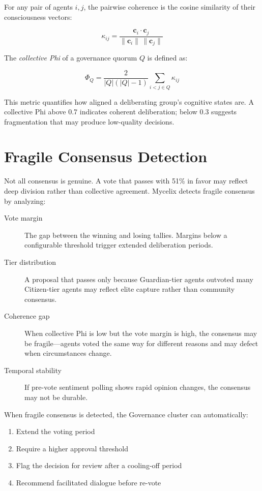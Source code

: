 \documentclass[12pt]{book}
\begin{document}
For any pair of agents $i, j$, the pairwise coherence is the cosine similarity
of their consciousness vectors:

\begin{equation}
  \kappa_{ij} = \frac{\mathbf{c}_i \cdot \mathbf{c}_j}{\|\mathbf{c}_i\| \, \|\mathbf{c}_j\|}
\end{equation}

The \emph{collective Phi} of a governance quorum $Q$ is defined as:

\begin{equation}
  \Phi_Q = \frac{2}{|Q|(|Q|-1)} \sum_{i < j \in Q} \kappa_{ij}
\end{equation}

This metric quantifies how aligned a deliberating group's cognitive states are.
A collective Phi above 0.7 indicates coherent deliberation; below 0.3 suggests
fragmentation that may produce low-quality decisions.

\section{Fragile Consensus Detection}

Not all consensus is genuine. A vote that passes with 51\% in favor may reflect
deep division rather than collective agreement. Mycelix detects fragile consensus
by analyzing:

\begin{description}
  \item[Vote margin] The gap between the winning and losing tallies. Margins
    below a configurable threshold trigger extended deliberation periods.
  \item[Tier distribution] A proposal that passes only because Guardian-tier
    agents outvoted many Citizen-tier agents may reflect elite capture rather
    than community consensus.
  \item[Coherence gap] When collective Phi is low but the vote margin is high,
    the consensus may be fragile---agents voted the same way for different
    reasons and may defect when circumstances change.
  \item[Temporal stability] If pre-vote sentiment polling shows rapid opinion
    changes, the consensus may not be durable.
\end{description}

When fragile consensus is detected, the Governance cluster can automatically:
\begin{enumerate}
  \item Extend the voting period
  \item Require a higher approval threshold
  \item Flag the decision for review after a cooling-off period
  \item Recommend facilitated dialogue before re-vote
\end{enumerate}
\end{document}
